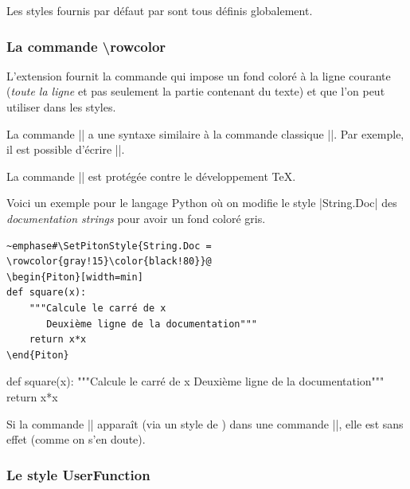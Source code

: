 \documentclass[dvipsnames,svgnames]{article}
\begin{document}
\medskip
Les styles fournis par défaut par  sont tous définis globalement.


\bigskip
\subsubsection{La commande \textbackslash rowcolor}

\label{rowcolor}

\nobreak
\medskip
L'extension  fournit la commande  qui impose un
fond coloré à la ligne courante (\emph{toute la ligne} et pas seulement la partie
contenant du texte) et que l'on peut utiliser dans les styles.

\smallskip
La commande |\rowcolor| a une syntaxe similaire à la commande classique |\color|. Par
exemple, il est possible d'écrire ||.

\smallskip
La commande |\rowcolor| est protégée contre le développement TeX.

\smallskip
Voici un exemple pour le langage Python où on modifie le style |String.Doc|
des \emph{documentation strings} pour avoir un fond coloré gris.


\medskip
\begin{Verbatim}
~emphase#\SetPitonStyle{String.Doc = \rowcolor{gray!15}\color{black!80}}@
\begin{Piton}[width=min]
def square(x):
    """Calcule le carré de x
       Deuxième ligne de la documentation"""
    return x*x
\end{Piton}
\end{Verbatim}


\bigskip
\begingroup
{}
\begin{Piton}[width=min]
def square(x):
    """Calcule le carré de x
       Deuxième ligne de la documentation"""
    return x*x
\end{Piton}
\endgroup

\bigskip
Si la commande |\rowcolor| apparaît (via un style de ) dans une commande
|\piton|, elle est sans effet (comme on s'en doute).


\bigskip
\subsubsection{Le style UserFunction}

\end{document}
